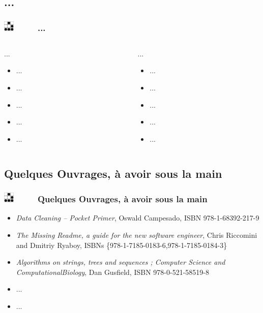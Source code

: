 \documentclass[slidetop,11pt]{beamer}
\def\sectionPartVe{...}
\def\sectionPartVf{Quelques Ouvrages, {\`a} avoir sous la main}
\def\moreInFrameTitle{\includegraphics[height=0.5cm]{img/logo_glider.png}~~~~~}
\begin{document}
\subsection{\sectionPartVe}
\begin{frame}
	\frametitle{\moreInFrameTitle \sectionPartVe}
	\begin{columns}[T]
	\begin{column}[T]{5.50cm}
		\begin{beamerboxesrounded}	[lower=substructureUN, %
		 				 upper=block title UN,%
						 shadow=true]%
		       {\sectionPartVe}
			\begin{itemize}
				\item ...
				\item ...
				\item ... 
				\item ... 
				\item ... 
			\end{itemize}
		\end{beamerboxesrounded}
	\end{column}
	\begin{column}[T]{5.50cm}
		\begin{beamerboxesrounded}	[lower=substructureTR, %
		 				 upper=block title TR,%
						 shadow=true]%
		       {\sectionPartVe}
			\begin{itemize}
				\item ...
				\item ...
				\item ... 
				\item ... 
				\item ... 
			\end{itemize}
		\end{beamerboxesrounded}
	\end{column}
	\end{columns}
\end{frame}

\subsection{\sectionPartVf}
\begin{frame}
	\frametitle{\moreInFrameTitle \sectionPartVf}
	\begin{itemize}
		\item \emph{Data Cleaning -- Pocket Primer}, Oswald Campesado, ISBN 978-1-68392-217-9
		\item \emph{The Missing Readme, a guide for the new software engineer}, Chris Riccomini and Dmitriy Ryaboy, ISBNs \{978-1-7185-0183-6,978-1-7185-0184-3\}
		\item \emph{Algorithms on strings, trees and sequences ; Computer Science and ComputationalBiology}, Dan Gusfield, ISBN 978-0-521-58519-8
		\item ...
		\item ... 
	\end{itemize}
\end{frame}
\end{document}
